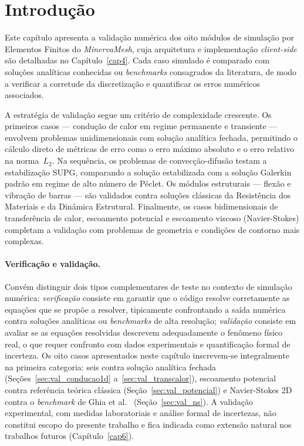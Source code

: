 
\section{Introdução}
\label{sec:resultados_intro}

Este capítulo apresenta a validação numérica dos oito módulos de simulação por Elementos Finitos do \textit{MinervaMesh}, cuja arquitetura e implementação \textit{client-side} são detalhadas no Capítulo~\ref{cap4}. Cada caso simulado é comparado com soluções analíticas conhecidas ou \textit{benchmarks} consagrados da literatura, de modo a verificar a corretude da discretização e quantificar os erros numéricos associados.

A estratégia de validação segue um critério de complexidade crescente. Os primeiros casos — condução de calor em regime permanente e transiente — envolvem problemas unidimensionais com solução analítica fechada, permitindo o cálculo direto de métricas de erro como o erro máximo absoluto e o erro relativo na norma~$L_2$. Na sequência, os problemas de convecção-difusão testam a estabilização SUPG, comparando a solução estabilizada com a solução Galerkin padrão em regime de alto número de Péclet. Os módulos estruturais — flexão e vibração de barras — são validados contra soluções clássicas da Resistência dos Materiais e da Dinâmica Estrutural. Finalmente, os casos bidimensionais de transferência de calor, escoamento potencial e escoamento viscoso (Navier-Stokes) completam a validação com problemas de geometria e condições de contorno mais complexas.

\paragraph{Verificação e validação.} Convém distinguir dois tipos complementares de teste no contexto de simulação numérica: \emph{verificação} consiste em garantir que o código resolve corretamente as equações que se propõe a resolver, tipicamente confrontando a saída numérica contra soluções analíticas ou \emph{benchmarks} de alta resolução; \emph{validação} consiste em avaliar se as equações resolvidas descrevem adequadamente o fenômeno físico real, o que requer confronto com dados experimentais e quantificação formal de incerteza. Os oito casos apresentados neste capítulo inscrevem-se integralmente na primeira categoria: seis contra solução analítica fechada (Seções~\ref{sec:val_conducao1d} a~\ref{sec:val_transcalor}), escoamento potencial contra referência teórica clássica (Seção~\ref{sec:val_potencial}) e Navier-Stokes 2D contra o \emph{benchmark} de Ghia et al.\ \cite{Ghia1982} (Seção~\ref{sec:val_ns}). A validação experimental, com medidas laboratoriais e análise formal de incertezas, não constitui escopo do presente trabalho e fica indicada como extensão natural nos trabalhos futuros (Capítulo~\ref{cap6}).

